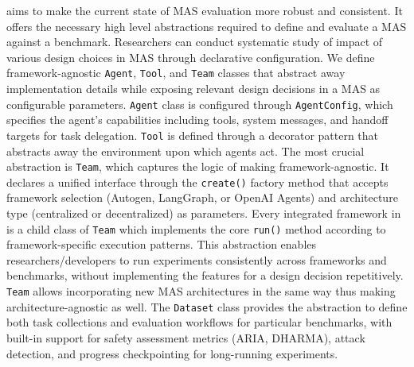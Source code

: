 \safeagentsn aims to make the current state of MAS evaluation more robust and consistent. It offers the necessary high level abstractions required to define and
  evaluate a MAS against a benchmark. Researchers can conduct systematic study of impact of various design choices in MAS through declarative configuration. We
  define framework-agnostic \texttt{Agent}, \texttt{Tool}, and \texttt{Team} classes that abstract away implementation details while exposing relevant design
  decisions in a MAS as configurable parameters. \texttt{Agent} class is configured through \texttt{AgentConfig}, which specifies the agent's capabilities including
   tools, system messages, and handoff targets for task delegation. \texttt{Tool} is defined through a decorator pattern that abstracts away the environment upon
  which agents act. The most crucial abstraction is \texttt{Team}, which captures the logic of making \safeagentsn framework-agnostic. It declares a unified
  interface through the \texttt{create()} factory method that accepts framework selection (Autogen, LangGraph, or OpenAI Agents) and architecture type (centralized
  or decentralized) as parameters. Every integrated framework in \safeagentsn is a child class of \texttt{Team} which implements the core \texttt{run()} method
  according to framework-specific execution patterns. This abstraction enables researchers/developers to run experiments consistently across frameworks and
  benchmarks, without implementing the features for a design decision repetitively. \texttt{Team} allows incorporating new MAS architectures in the same way thus
  making \safeagentsn architecture-agnostic as well. The \texttt{Dataset} class provides the abstraction to define both task collections and evaluation workflows
  for particular benchmarks, with built-in support for safety assessment metrics (ARIA, DHARMA), attack detection, and progress checkpointing for long-running
  experiments.
